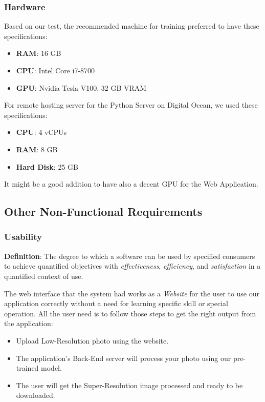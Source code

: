 \documentclass[12pt]{article}
\begin{document}
			\subsubsection{Hardware}
				Based on our test, the recommended machine for training preferred to have these specifications:
				\begin{itemize}
					\item \textbf{RAM}: 16 GB
					\item \textbf{CPU}: Intel Core i7-8700
					\item \textbf{GPU}: Nvidia Tesla V100, 32 GB VRAM
				\end{itemize}
				
				For remote hosting server for the Python Server on Digital Ocean, we used these specifications:
				\begin{itemize}
					\item \textbf{CPU}: 4 vCPUs
					\item \textbf{RAM}: 8 GB
					\item \textbf{Hard Disk}: 25 GB
				\end{itemize}
				It might be a good addition to have also a decent GPU for the Web Application.
		\subsection{Other Non-Functional Requirements}
			\subsubsection{Usability}
				\textbf{Definition}: The degree to which a software can be used by specified consumers to achieve quantified objectives with \textit{effectiveness}, \textit{efficiency}, and \textit{satisfaction} in a quantified context of use.
				
				The web interface that the system had works as a \textit{Website} for the user to use our application correctly without a need for learning specific skill or special operation. All the user need is to follow those steps to get the right output from the application:
				\begin{itemize}
					\item Upload Low-Resolution photo using the website.
					\item The application's Back-End server will process your photo using our pre-trained model.
					\item The user will get the Super-Resolution image processed and ready to be downloaded.
				\end{itemize}
				
\end{document}
